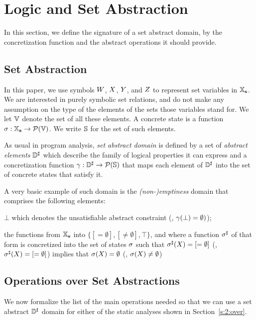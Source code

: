 \section{Logic and Set Abstraction}
\label{sec:logic-and-set-abstraction}
In this section, we define the signature of a set abstract domain, by the
concretization function and the abstract operations it should provide.

\subsection{Set Abstraction}
\label{s:3:1:abs}
In this paper, we use symbols $W$, $X$, $Y$, and $Z$
to represent set variables in $\mathbb{X}_{\bf s}$.
We are interested in purely symbolic set relations, and do not make any
assumption on the type of the elements of the sets those variables stand
for.
We let \( \mathbb{V} \) denote the set of all these elements.
A concrete state is a function \( \sigma: \mathbb{X}_{\bf s} \rightarrow
\mathcal{P}(\mathbb{V}) \).
We write \( \mathbb{S} \) for the set of such elements.

As usual in program analysis, {\em set abstract domain} is defined by a
set of {\em abstract elements} \( {\mathbb{D}}^{\sharp} \) which describe the family of
logical properties it can express and a concretization function
\( \gamma: {\mathbb{D}}^{\sharp} \rightarrow \mathcal{P}(\mathbb{S}) \) that maps each
element of \( {\mathbb{D}}^{\sharp} \) into the set of concrete states that satisfy it.
\begin{example}
  \label{ex:1:mt}
  A very basic example of such domain is the {\em (non-)emptiness} domain
  that comprises the following elements:
  \begin{compactitem}
  \item \( \bot \) which denotes the unsatisfiable abstract constraint
    (\ie, \( \gamma( \bot ) = \emptyset ) \));
  \item the functions from \( \mathbb{X}_{\bf s} \) into \( \{ [=\emptyset],
    [\not=\emptyset], \top \} \), and where a function \( {\sigma}^{\sharp} \) of
    that form is concretized into the set of states \( \sigma \) such that
    \( {\sigma}^{\sharp}( X ) = [=\emptyset] \) (\resp, \( {\sigma}^{\sharp}( X ) =
    [=\emptyset] \)) implies that \( \sigma( X ) = \emptyset \)
    (\resp, \( \sigma( X ) \not= \emptyset \))
  \end{compactitem}
\end{example}

\subsection{Operations over Set Abstractions}
\label{s:3:2:sign}
We now formalize the list of the main operations needed so that we can use
a set abstract \( {\mathbb{D}}^{\sharp} \) domain for either of the static analyses shown
in Section~\ref{s:2:over}.

